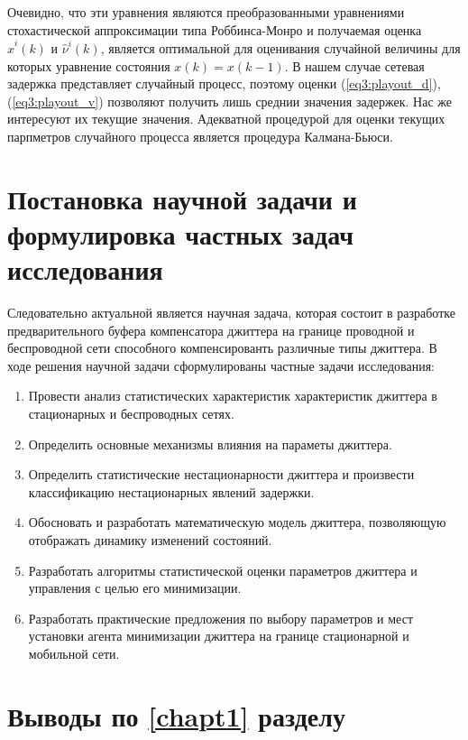 Очевидно, что эти уравнения являются преобразованными уравнениями стохастической аппроксимации типа Роббинса-Монро и получаемая оценка $\hat{x}^{i}(k)$ и $\hat{\nu}^{i}(k)$, является оптимальной для оценивания случайной величины для которых уравнение состояния $x(k)=x(k-1)$. 
В нашем случае сетевая задержка представляет случайный процесс, поэтому оценки (\ref{eq3:playout_d}), (\ref{eq3:playout_v}) позволяют получить лишь среднии значения задержек. 
Нас же интересуют их текущие значения. Адекватной процедурой для оценки текущих парпметров случайного процесса является процедура Калмана-Бьюси.




\section{Постановка научной задачи и формулировка частных задач исследования } \label{sect1_tasks}

Следовательно актуальной является научная задача, которая состоит в разработке предварительного буфера компенсатора джиттера на границе проводной и беспроводной сети способного компенсированть различные типы джиттера.
В ходе решения научной задачи сформулированы частные задачи исследования:
\begin{enumerate}
  \item Провести анализ статистических характеристик характеристик джиттера в стационарных и беспроводных сетях.
  \item Определить основные механизмы влияния на параметы джиттера.
  \item Определить статистические нестационарности джиттера и произвести классификацию нестационарных явлений задержки.
  \item Обосновать и разработать математическую модель джиттера, позволяющую отображать динамику изменений состояний.
  \item Разработать алгоритмы статистической оценки параметров джиттера и управления с целью его минимизации.
  \item Разработать практические предложения по выбору параметров и мест установки агента минимизации джиттера на границе стационарной и мобильной сети.
\end{enumerate}


\section{Выводы по \ref{chapt1} разделу } \label{sect1_conclus}

